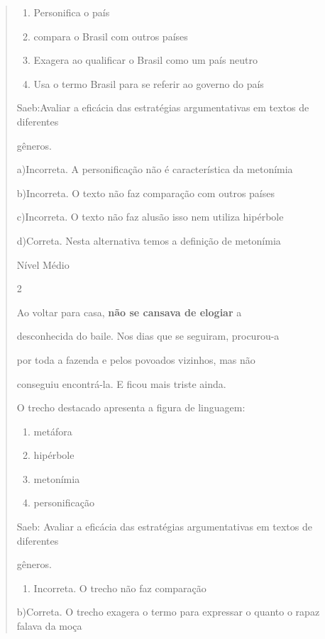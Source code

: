 {\begin{quote}
{\begin{enumerate}
\item
  Personifica o país
\item
  compara o Brasil com outros países
\item
  Exagera ao qualificar o Brasil como um país neutro
\item
  Usa o termo Brasil para se referir ao governo do país
\end{enumerate}

Saeb:Avaliar a eficácia das estratégias argumentativas em textos de
diferentes

gêneros.

a)Incorreta. A personificação não é característica da metonímia

b)Incorreta. O texto não faz comparação com outros países

c)Incorreta. O texto não faz alusão isso nem utiliza hipérbole

d)Correta. Nesta alternativa temos a definição de metonímia

Nível Médio

\num{2}

Ao voltar para casa, \textbf{não se cansava de elogiar} a

desconhecida do baile. Nos dias que se seguiram, procurou-a

por toda a fazenda e pelos povoados vizinhos, mas não

conseguiu encontrá-la. E ficou mais triste ainda.

O trecho destacado apresenta a figura de linguagem:

\begin{enumerate}

\item
  metáfora
\item
  hipérbole
\item
  metonímia
\item
  personificação
\end{enumerate}

Saeb: Avaliar a eficácia das estratégias argumentativas em textos de
diferentes

gêneros.

\begin{enumerate}
\def\labelenumi{\arabic{enumi}.}
\tightlist
\item
  Incorreta. O trecho não faz comparação
\end{enumerate}

b)Correta. O trecho exagera o termo para expressar o quanto o rapaz
falava da moça

}
\end{quote}}
